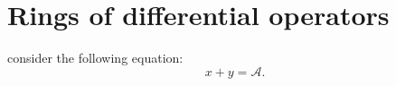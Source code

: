 \documentclass[reqno]{amsart} 
\begin{document}
\section{Rings of differential operators}
consider the following equation:
\begin{equation}\label{eqn:d1be095e232e}
x + y = \mathcal{A}.
\end{equation}

{} 
\end{document}
